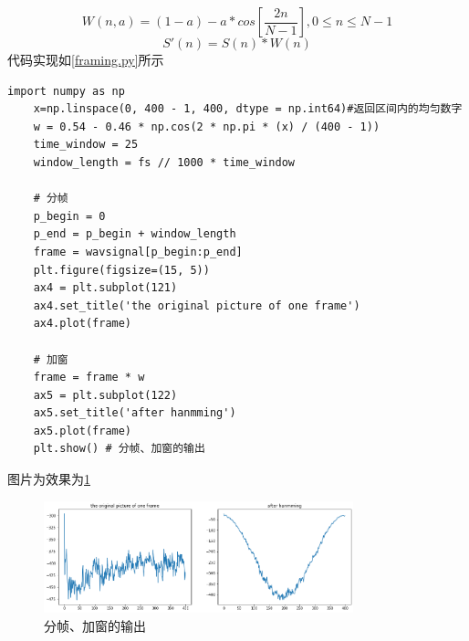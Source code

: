 \documentclass[12pt,a4paper,fancyhdr,openany,oneside]{ctexbook}
\begin{document}
\begin{displaymath}
        W\left ( n,a \right ) = \left ( 1-a \right )-a*cos\left [ \frac{2n}{N-1} \right ], 0\leq n\leq N-1 
\end{displaymath}
\begin{equation}
    \label{hanmming}
        S' \left ( n \right ) = S\left ( n \right )*W\left ( n \right )
\end{equation}
代码实现如\ref{framing.py}所示
\begin{lstlisting}[style=Python, caption={framing.py}, label={framing.py}]
    import numpy as np
    x=np.linspace(0, 400 - 1, 400, dtype = np.int64)#返回区间内的均匀数字
    w = 0.54 - 0.46 * np.cos(2 * np.pi * (x) / (400 - 1))
    time_window = 25
    window_length = fs // 1000 * time_window

    # 分帧
    p_begin = 0
    p_end = p_begin + window_length
    frame = wavsignal[p_begin:p_end]
    plt.figure(figsize=(15, 5))
    ax4 = plt.subplot(121)
    ax4.set_title('the original picture of one frame')
    ax4.plot(frame)

    # 加窗
    frame = frame * w
    ax5 = plt.subplot(122)
    ax5.set_title('after hanmming')
    ax5.plot(frame)
    plt.show() # 分帧、加窗的输出
\end{lstlisting}
图片为效果为\ref{framing.png}
\begin{figure}[htbp]
    \centering
        \includegraphics[width=0.8\textwidth]{resource/img/framing.png}
        \caption{分帧、加窗的输出}
        \label{framing.png}
\end{figure}
\end{document}
